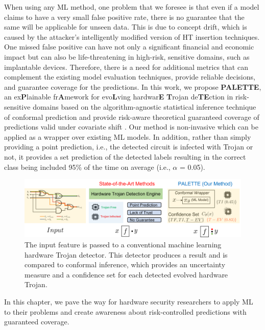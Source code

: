 When using any ML method, one problem that we foresee is that even if a model claims to have a very small false positive rate, there is no guarantee that the same will be applicable for unseen data. This is due to concept drift, which is caused by the attacker's intelligently modified version of HT insertion techniques. One missed false positive can have not only a significant financial and economic impact but can also be life-threatening in high-risk, sensitive domains, such as implantable devices. Therefore, there is a need for additional metrics that can complement the existing model evaluation techniques, provide reliable decisions, and guarantee coverage for the predictions. In this work, we propose \textbf{PALETTE}, an ex\textbf{P}lainable fr\textbf{A}mework for evo\textbf{L}ving hardwar\textbf{E} \textbf{T}rojan de\textbf{TE}ction in risk-sensitive domains based on the algorithm-agnostic statistical inference technique of conformal prediction \cite{shafer2008tutorial} and provide risk-aware theoretical guaranteed coverage of predictions valid under covariate shift \cite{tibshirani2019conformal}. Our method is non-invasive which can be applied as a wrapper over existing ML models. In addition, rather than simply providing a point prediction, i.e., the detected circuit is infected with Trojan or not, it provides a set prediction of the detected labels resulting in the correct class being included 95\% of the time on average (i.e., $\alpha$ = 0.05).

\begin{figure}[ht]
  \centering
   \includegraphics[width=1\linewidth]{figs/Intro3.png}
   \caption{The input feature is passed to a conventional machine learning hardware Trojan detector. This detector produces a result and is compared to conformal inference, which provides an uncertainty measure and a confidence set for each detected evolved hardware Trojan.}
  \label{fig:intro}
\end{figure}

In this chapter, we pave the way for hardware security researchers to apply ML to their problems and create awareness about risk-controlled predictions with guaranteed coverage.

